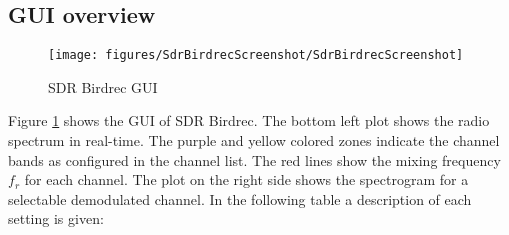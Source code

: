 \documentclass[10pt]{article}
\begin{document}
\subsection{GUI overview}\label{gui-overview}
\begin{figure}[h!]
\begin{center}
\texttt{[image: figures/SdrBirdrecScreenshot/SdrBirdrecScreenshot]}
\caption{{SDR Birdrec GUI
{\label{107300}}%
}}
\end{center}
\end{figure}

Figure \ref{107300} shows the GUI of SDR Birdrec. The bottom left plot shows the radio spectrum in real-time. The purple and yellow colored zones indicate the channel bands as configured in the channel list. The red lines show the mixing frequency \(f_r\) for each channel. The plot on the right side shows the spectrogram for a selectable  demodulated channel. In the following table a description of each setting is given:
\end{document}
